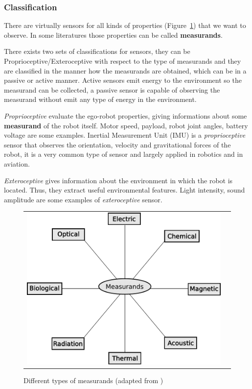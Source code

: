 \subsubsection{Classification}

There are virtually sensors for all kinds of properties (Figure~\ref{fig:sensors}) that we want to observe. In some literatures those properties can be called \textbf{measurands}\cite{riener2010sensor}. 

There exists two sets of classifications for sensors, they can be Proprioceptive/Exteroceptive with respect to the type of measurands and \cite{iyengar1991autonomous} they are classified in the manner how the measurands are obtained, which can be in a passive or active \cite{Hebert_2000_3595} manner. Active sensors emit energy to the environment so the measurand can be collected, a passive sensor is capable of observing the measurand without emit any type of energy in the environment.

\textit{Proprioceptive} evaluate the ego-robot properties, giving informations about some \textbf{measurand} of the robot itself. Motor speed, payload, robot joint angles, battery voltage are some examples.  Inertial Measurement Unit (IMU) is a \textit{proprioceptive} sensor that observes the orientation, velocity and gravitational forces of the robot, it is a very common type of sensor and largely applied in robotics and in aviation.

\textit{Exteroceptive} gives information about the environment in which the robot is located. Thus, they extract useful environmental features. Light intensity, sound amplitude are some examples of \textit{exteroceptive} sensor.

\begin{figure}[h]
   \centering
     \begin{tabular}{lr}
       \includegraphics[scale=0.70]{img/fig:sensors}
     \end{tabular}
   \caption{Different types of measurands (adapted from \cite{WhiteRichard})}
   \label{fig:sensors}
 \end{figure}

